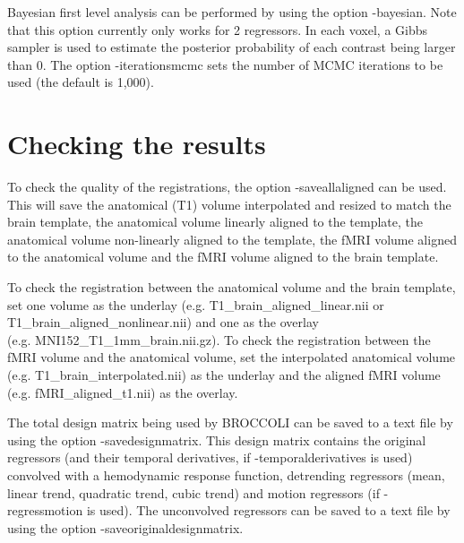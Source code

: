 Bayesian first level analysis can be performed by using the option -bayesian.  Note that this option currently only works for 2 regressors. In each voxel, a Gibbs sampler is used to estimate the posterior probability of each contrast being larger than 0. The option -iterationsmcmc sets the number of MCMC iterations to be used (the default is 1,000).

\section{Checking the results}

To check the quality of the registrations, the option -saveallaligned can be used. This will save the anatomical (T1) volume interpolated and resized to match the brain template, the anatomical volume linearly aligned to the template, the anatomical volume non-linearly aligned to the template, the fMRI volume aligned to the anatomical volume and the fMRI volume aligned to the brain template. 

To check the registration between the anatomical volume and the brain template, set one volume as the underlay (e.g. T1\_brain\_aligned\_linear.nii or T1\_brain\_aligned\_nonlinear.nii) and one as the overlay \\ (e.g. MNI152\_T1\_1mm\_brain.nii.gz). To check the registration between the fMRI volume and the anatomical volume, set the interpolated anatomical volume (e.g. T1\_brain\_interpolated.nii) as the underlay and the aligned fMRI volume (e.g. fMRI\_aligned\_t1.nii) as the overlay.

The total design matrix being used by BROCCOLI can be saved to a text file by using the option -savedesignmatrix. This design matrix contains the original regressors (and their temporal derivatives, if -temporalderivatives is used) convolved with a hemodynamic response function, detrending regressors (mean, linear trend, quadratic trend, cubic trend) and motion regressors (if -regressmotion is used). The unconvolved regressors can be saved to a text file by using the option -saveoriginaldesignmatrix.









